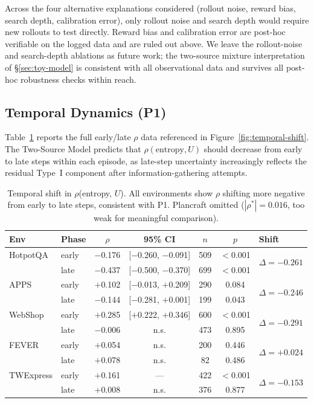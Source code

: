 Across the four alternative explanations considered (rollout
noise, reward bias, search depth, calibration error), only
rollout noise and search depth would require new rollouts to
test directly. Reward bias and calibration error are post-hoc
verifiable on the logged data and are ruled out above. We leave
the rollout-noise and search-depth ablations as future work; the
two-source mixture interpretation of \S\ref{sec:toy-model} is
consistent with all observational data and survives all
post-hoc robustness checks within reach.


\subsection{Temporal Dynamics (P1)}
\label{app:temporal}

Table~\ref{tab:temporal} reports the full early/late $\rho$ data
referenced in Figure~\ref{fig:temporal-shift}. The Two-Source Model
predicts that $\rho(\text{entropy}, U)$ should decrease from early
to late steps within each episode, as late-step uncertainty
increasingly reflects the residual Type~I component after
information-gathering attempts.

\begin{table}[h]
\centering
\caption{Temporal shift in $\rho$(entropy, $U$). All environments
show $\rho$ shifting more negative from early to late steps,
consistent with P1. Plancraft omitted ($|\rho^*|{=}0.016$, too weak
for meaningful comparison).}
\label{tab:temporal}
\begin{tabular}{llccccl}
\toprule
\textbf{Env} & \textbf{Phase} & $\rho$ & \textbf{95\% CI}
  & $n$ & $p$ & \textbf{Shift} \\
\midrule
HotpotQA & early & $-$0.176 & [$-$0.260, $-$0.091] & 509
  & $<$0.001
  & \multirow{2}{*}{$\Delta{=}{-}0.261$} \\
  & late  & $-$0.437 & [$-$0.500, $-$0.370] & 699
  & $<$0.001 & \\
\midrule
APPS & early & $+$0.102 & [$-$0.013, $+$0.209] & 290
  & 0.084
  & \multirow{2}{*}{$\Delta{=}{-}0.246$} \\
  & late  & $-$0.144 & [$-$0.281, $+$0.001] & 199
  & 0.043 & \\
\midrule
WebShop & early & $+$0.285 & [$+$0.222, $+$0.346] & 600
  & $<$0.001
  & \multirow{2}{*}{$\Delta{=}{-}0.291$} \\
  & late  & $-$0.006 & n.s. & 473 & 0.895 & \\
\midrule
FEVER & early & $+$0.054 & n.s. & 200 & 0.446
  & \multirow{2}{*}{$\Delta{=}{+}0.024$} \\
  & late  & $+$0.078 & n.s. & 82 & 0.486 & \\
\midrule
TWExpress & early & $+$0.161 & --- & 422 & $<$0.001
  & \multirow{2}{*}{$\Delta{=}{-}0.153$} \\
  & late  & $+$0.008 & n.s. & 376 & 0.877 & \\
\bottomrule
\end{tabular}
\end{table}

